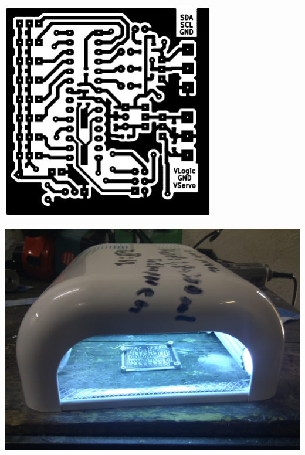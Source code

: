 \documentclass[pdf]{beamer}
\begin{document}
\begin{frame}
  \begin{center}
  \includegraphics[width = 0.7\textwidth]{pics/raw/servoboard_plot.png}
  \end{center}
\end{frame}

\begin{frame}
  \begin{center}
  \includegraphics[width = \textwidth]{pics/raw/servoboard_light.jpg}
  \end{center}
\end{frame}
\end{document}
